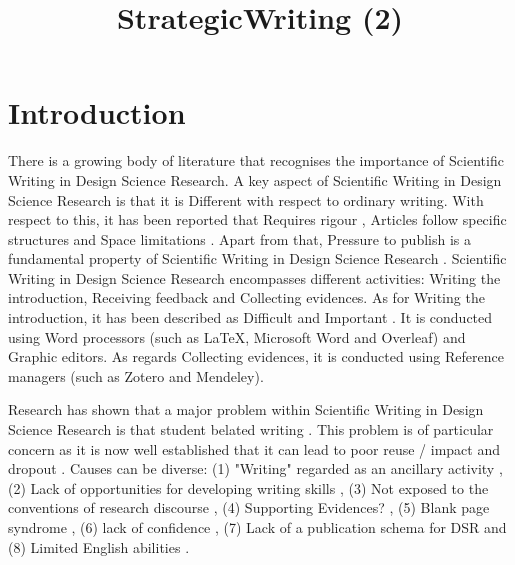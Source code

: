 \documentclass{article}
\title{StrategicWriting (2)}
\author{}
\begin{document}
\maketitle
      

\section{Introduction}

There is a growing body of literature that recognises the importance of Scientific Writing in Design Science Research. A key aspect of Scientific Writing in Design Science Research is that it is Different with respect to ordinary writing. With respect to this, it has been reported that Requires rigour \cite{JohannessonAnIntroduction}, Articles follow specific structures \cite{Turbek2016} \cite{JohannessonAnIntroduction} \cite{psychologicalscience.org} \cite{Kanoksilapatham2012} and Space limitations \cite{Gregor2013} \cite{Hsu2004}. Apart from that, Pressure to publish is a fundamental property of Scientific Writing in Design Science Research \cite{CoylarBecomingwriters} \cite{Turbek2016} \cite{Sorensen1994} \cite{Kanoksilapatham2012} \cite{Mizumoto2017} \cite{Cotterall2011}. Scientific Writing in Design Science Research encompasses different activities: Writing the introduction, Receiving feedback and Collecting evidences. As for Writing the introduction, it has been described as Difficult \cite{Hsu2004} \cite{Hsu2004} \cite{Hsu2004} \cite{PeatScientificWriting.} \cite{Cotterall2011} and Important \cite{Gregor2013} \cite{Turbek2016} \cite{Turbek2016} \cite{SwalesTheWriting} \cite{Khaw2017} \cite{Kanoksilapatham2012}. It is conducted using Word processors (such as LaTeX, Microsoft Word and Overleaf) and Graphic editors. As regards Collecting evidences, it is conducted using Reference managers (such as Zotero and Mendeley). 
    
Research has shown that a major problem within Scientific Writing in Design Science Research is that student belated writing \cite{Wellington2010} \cite{Badley2009} \cite{Turbek2016}. This problem is of particular concern as it is now well established that it can lead to poor reuse / impact and dropout \cite{Wellington2010} \cite{Itua2014}. Causes can be diverse: (1) "Writing" regarded as an ancillary activity \cite{Turbek2016} \cite{Turbek2016}, (2) Lack of opportunities for developing writing skills \cite{Cotterall2011}, (3) Not exposed to the conventions of research discourse \cite{Elton2010} \cite{Badenhorst2015} \cite{Wellington2010} \cite{Cotterall2011} \cite{Itua2014}, (4) Supporting Evidences? \cite{Hsu2004} \cite{Badenhorst2015} \cite{Badenhorst2015} \cite{Cotterall2011} \cite{Itua2014} \cite{Cameron2009} \cite{Lindsay1854}, (5) Blank page syndrome \cite{Lindsay1854} \cite{Sorensen1994} \cite{Wellington2010} \cite{Cameron2009}, (6) lack of confidence \cite{Carter2012}, (7) Lack of a publication schema for DSR \cite{Gregor2013} \cite{Gregor2013} and (8) Limited English abilities \cite{Mizumoto2017} \cite{Cotterall2011} \cite{Anthony2003}. 
    
\end{document}
